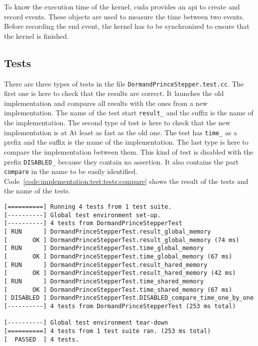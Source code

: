 To know the execution time of the kernel, \acrshort{cuda} provides an \acrshort{api}
to create and record events.
These objects are used to measure the time between two events.
Before recording the end event, the kernel has to be synchronized to ensure
that the kernel is finished.

\subsection{Tests}
\label{ch:implementation:test:tests}

There are three types of tests in the file \texttt{DormandPrinceStepper.test.cc}.
The first one is here to check that the results are correct.
It launches the old implementation and compares all results with the ones from a
new implementation.
The name of the test start \texttt{result\_} and the suffix is the name of the
implementation.
The second type of test is here to check that the new implementation is at
At least as fast as the old one.
The test has \texttt{time\_} as a prefix and the suffix is the name of the
implementation.
The last type is here to compare the implementation between them.
This kind of test is disabled with the prefix \texttt{DISABLED\_} because
they contain no assertion.
It also contains the part \texttt{compare} in the name to be easily identified.
Code~\ref{code:implementation:test:tests:compare} shows the result of the tests
and the name of the tests.

\begin{code}
    \label{code:implementation:test:tests:compare}
    \begin{verbatim}
[==========] Running 4 tests from 1 test suite.
[----------] Global test environment set-up.
[----------] 4 tests from DormandPrinceStepperTest
[ RUN      ] DormandPrinceStepperTest.result_global_memory
[       OK ] DormandPrinceStepperTest.result_global_memory (74 ms)
[ RUN      ] DormandPrinceStepperTest.time_global_memory
[       OK ] DormandPrinceStepperTest.time_global_memory (67 ms)
[ RUN      ] DormandPrinceStepperTest.result_hared_memory
[       OK ] DormandPrinceStepperTest.result_hared_memory (42 ms)
[ RUN      ] DormandPrinceStepperTest.time_shared_memory
[       OK ] DormandPrinceStepperTest.time_shared_memory (67 ms)
[ DISABLED ] DormandPrinceStepperTest.DISABLED_compare_time_one_by_one
[----------] 4 tests from DormandPrinceStepperTest (253 ms total)

[----------] Global test environment tear-down
[==========] 4 tests from 1 test suite ran. (253 ms total)
[  PASSED  ] 4 tests.
    \end{verbatim}
\end{code}




